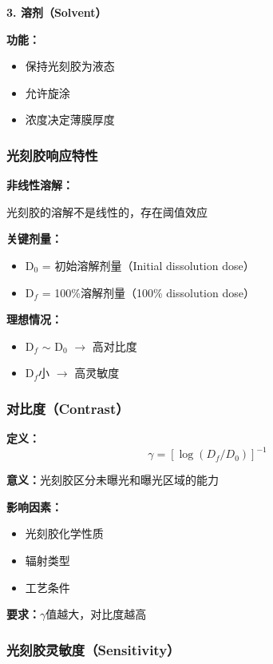\documentclass[UTF8,12pt,a4paper]{ctexart}
\begin{document}
\textbf{3. 溶剂（Solvent）}

\textbf{功能：}
\begin{itemize}
    \item 保持光刻胶为液态
    \item 允许旋涂
    \item 浓度决定薄膜厚度
\end{itemize}

\subsubsection{光刻胶响应特性}

\textbf{非线性溶解：}

光刻胶的溶解不是线性的，存在阈值效应

\textbf{关键剂量：}
\begin{itemize}
    \item D$_0$ = 初始溶解剂量（Initial dissolution dose）
    \item D$_f$ = 100\%溶解剂量（100\% dissolution dose）
\end{itemize}

\textbf{理想情况：}
\begin{itemize}
    \item D$_f$ $\sim$ D$_0$ $\rightarrow$ 高对比度
    \item D$_f$小 $\rightarrow$ 高灵敏度
\end{itemize}

\subsubsection{对比度（Contrast）}

\textbf{定义：}
\begin{equation}
\gamma = [\log(D_f/D_0)]^{-1}
\end{equation}

\textbf{意义：}光刻胶区分未曝光和曝光区域的能力

\textbf{影响因素：}
\begin{itemize}
    \item 光刻胶化学性质
    \item 辐射类型
    \item 工艺条件
\end{itemize}

\textbf{要求：}$\gamma$值越大，对比度越高

\subsubsection{光刻胶灵敏度（Sensitivity）}
\end{document}
